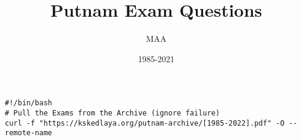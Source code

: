 \documentclass{article}
\title{Putnam Exam Questions}
\author{MAA}
\date{1985-2021}
\begin{document}
\maketitle
\thispagestyle{empty}
\begin{center}
\begin{BVerbatim}
#!/bin/bash
# Pull the Exams from the Archive (ignore failure)
curl -f "https://kskedlaya.org/putnam-archive/[1985-2022].pdf" -O --remote-name
\end{BVerbatim}
\end{center}

\newpage





















\end{document}
